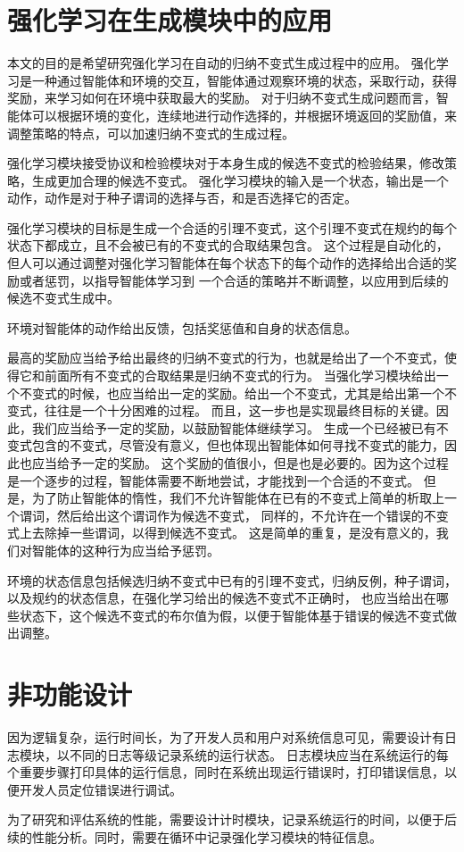 \section{强化学习在生成模块中的应用}

本文的目的是希望研究强化学习在自动的归纳不变式生成过程中的应用。
强化学习是一种通过智能体和环境的交互，智能体通过观察环境的状态，采取行动，获得奖励，来学习如何在环境中获取最大的奖励。
对于归纳不变式生成问题而言，智能体可以根据环境的变化，连续地进行动作选择的，并根据环境返回的奖励值，来调整策略的特点，可以加速归纳不变式的生成过程。

强化学习模块接受\TLA 协议和检验模块对于本身生成的候选不变式的检验结果，修改策略，生成更加合理的候选不变式。
强化学习模块的输入是一个状态，输出是一个动作，动作是对于种子谓词的选择与否，和是否选择它的否定。

强化学习模块的目标是生成一个合适的引理不变式，这个引理不变式在规约的每个状态下都成立，且不会被已有的不变式的合取结果包含。
这个过程是自动化的，但人可以通过调整对强化学习智能体在每个状态下的每个动作的选择给出合适的奖励或者惩罚，以指导智能体学习到
一个合适的策略并不断调整，以应用到后续的候选不变式生成中。

环境对智能体的动作给出反馈，包括奖惩值和自身的状态信息。

最高的奖励应当给予给出最终的归纳不变式的行为，也就是给出了一个不变式，使得它和前面所有不变式的合取结果是归纳不变式的行为。
当强化学习模块给出一个不变式的时候，也应当给出一定的奖励。给出一个不变式，尤其是给出第一个不变式，往往是一个十分困难的过程。
而且，这一步也是实现最终目标的关键。因此，我们应当给予一定的奖励，以鼓励智能体继续学习。
生成一个已经被已有不变式包含的不变式，尽管没有意义，但也体现出智能体如何寻找不变式的能力，因此也应当给予一定的奖励。
这个奖励的值很小，但是也是必要的。因为这个过程是一个逐步的过程，智能体需要不断地尝试，才能找到一个合适的不变式。
但是，为了防止智能体的惰性，我们不允许智能体在已有的不变式上简单的析取上一个谓词，然后给出这个谓词作为候选不变式，
同样的，不允许在一个错误的不变式上去除掉一些谓词，以得到候选不变式。
这是简单的重复，是没有意义的，我们对智能体的这种行为应当给予惩罚。

环境的状态信息包括候选归纳不变式中已有的引理不变式，归纳反例，种子谓词，以及规约的状态信息，在强化学习给出的候选不变式不正确时，
也应当给出在哪些状态下，这个候选不变式的布尔值为假，以便于智能体基于错误的候选不变式做出调整。

\section{非功能设计}

因为逻辑复杂，运行时间长，为了开发人员和用户对系统信息可见，需要设计有日志模块，以不同的日志等级记录系统的运行状态。
日志模块应当在系统运行的每个重要步骤打印具体的运行信息，同时在系统出现运行错误时，打印错误信息，以便开发人员定位错误进行调试。

为了研究和评估系统的性能，需要设计计时模块，记录系统运行的时间，以便于后续的性能分析。同时，需要在循环中记录强化学习模块的特征信息。
